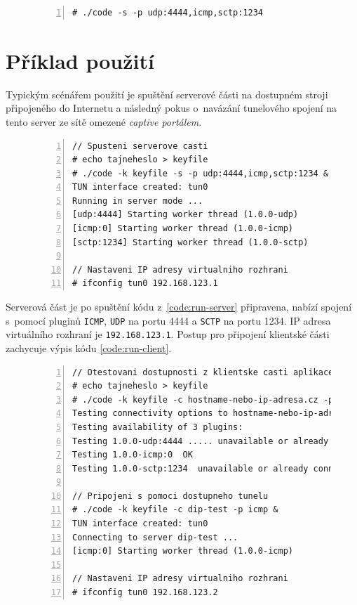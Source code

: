 \documentclass[thesis=M,czech]{FITthesis}[2012/10/20]
\begin{document}
        \begin{figure}[h]
	\begin{lstlisting}[label=code:plugin-spec-example,caption=Ukázka spuštění serverové části s~více pluginy a jejich parametry,frame=single,numbers=left]
# ./code -s -p udp:4444,icmp,sctp:1234
      \end{lstlisting}
    \end{figure}
    
    \section{Příklad použití}
    
    Typickým scénářem použití je spuštění serverové části na dostupném stroji připojeného do Internetu a následný pokus o~navázání tunelového spojení na tento server ze sítě omezené \textit{captive portálem}.
    
            \begin{figure}[h]
	\begin{lstlisting}[label=code:run-server,caption=Ukázka spuštění serverové části s~více pluginy a jejich parametry,frame=single,numbers=left,linewidth=1.1\textwidth]
// Spusteni serverove casti
# echo tajneheslo > keyfile
# ./code -k keyfile -s -p udp:4444,icmp,sctp:1234 &
TUN interface created: tun0
Running in server mode ...
[udp:4444] Starting worker thread (1.0.0-udp)
[icmp:0] Starting worker thread (1.0.0-icmp)
[sctp:1234] Starting worker thread (1.0.0-sctp)

// Nastaveni IP adresy virtualniho rozhrani
# ifconfig tun0 192.168.123.1
      \end{lstlisting}
    \end{figure}
    
    Serverová část je po spuštění kódu z~\ref{code:run-server} připravena, nabízí spojení s~pomocí pluginů \texttt{ICMP}, \texttt{UDP} na portu 4444 a \texttt{SCTP} na portu 1234. IP adresa virtuálního rozhraní je \texttt{192.168.123.1}. Postup pro připojení klientské části zachycuje výpis kódu \ref{code:run-client}.
    
            \begin{figure}[h]
	\begin{lstlisting}[label=code:run-client,caption=Ukázka spuštění klientské části s~otestováním pluginů a následném připojení s~pomocí jednoho z~nich,frame=single,numbers=left,linewidth=1.1\textwidth]
// Otestovani dostupnosti z klientske casti aplikace
# echo tajneheslo > keyfile
# ./code -k keyfile -c hostname-nebo-ip-adresa.cz -p udp:4444,icmp,sctp:1234 -t
Testing connectivity options to hostname-nebo-ip-adresa.cz ...
Testing availability of 3 plugins:
Testing 1.0.0-udp:4444 ..... unavailable or already connected
Testing 1.0.0-icmp:0  OK
Testing 1.0.0-sctp:1234  unavailable or already connected

// Pripojeni s pomoci dostupneho tunelu
# ./code -k keyfile -c dip-test -p icmp &
TUN interface created: tun0
Connecting to server dip-test ...
[icmp:0] Starting worker thread (1.0.0-icmp)

// Nastaveni IP adresy virtualniho rozhrani
# ifconfig tun0 192.168.123.2
      \end{lstlisting}
    \end{figure}
    
\end{document}
